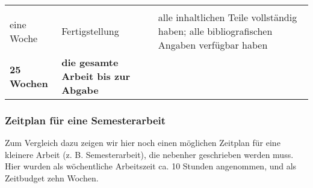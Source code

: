 \documentclass[]{article}
\begin{document}
\begin{longtable}[]{@{}lll@{}}
\begin{minipage}[t]{0.41\columnwidth}
\end{minipage}\tabularnewline
\begin{minipage}[t]{0.16\columnwidth}\raggedright\strut
eine Woche\strut
\end{minipage} & \begin{minipage}[t]{0.35\columnwidth}\raggedright\strut
Fertigstellung\strut
\end{minipage} & \begin{minipage}[t]{0.41\columnwidth}\raggedright\strut
alle inhaltlichen Teile vollständig haben; alle bibliografischen Angaben
verfügbar haben\strut
\end{minipage}\tabularnewline
\begin{minipage}[t]{0.16\columnwidth}\raggedright\strut
\textbf{25 Wochen}\strut
\end{minipage} & \begin{minipage}[t]{0.35\columnwidth}\raggedright\strut
\textbf{die gesamte Arbeit bis zur Abgabe}\strut
\end{minipage} & \begin{minipage}[t]{0.41\columnwidth}\raggedright\strut
\strut
\end{minipage}\tabularnewline
\bottomrule
\end{longtable}

\subsubsection{Zeitplan für eine
Semesterarbeit}\label{zeitplan-fur-eine-semesterarbeit}

Zum Vergleich dazu zeigen wir hier noch einen möglichen Zeitplan für
eine kleinere Arbeit (z. B. Semesterarbeit), die nebenher geschrieben
werden muss. Hier wurden als wöchentliche Arbeitszeit ca. 10 Stunden
angenommen, und als Zeitbudget zehn Wochen.
\end{document}
